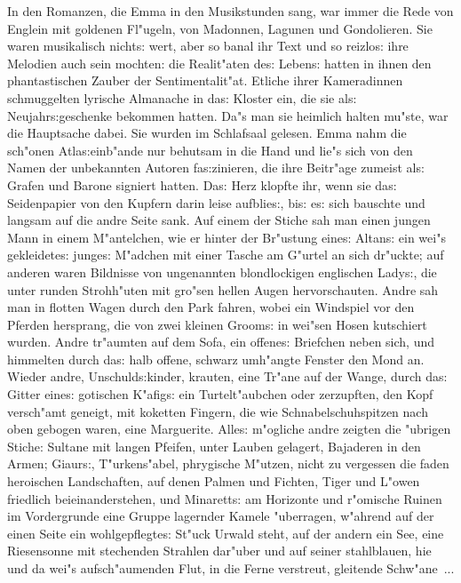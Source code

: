 \documentclass[oneside,12pt]{book}
\newcommand{\s}{s:}%
\begin{document}
In den Romanzen, die Emma in den Musikstunden sang, war immer die
Rede von Englein mit goldenen Fl"ugeln, von Madonnen, Lagunen und
Gondolieren. Sie waren musikalisch nicht{\s} wert, aber so banal
ihr Text und so reizlo{\s} ihre Melodien auch sein mochten: die
Realit"aten de{\s} Leben{\s} hatten in ihnen den phantastischen
Zauber der Sentimentalit"at. Etliche ihrer Kameradinnen
schmuggelten lyrische Almanache in da{\s} Kloster ein, die sie
al{\s} Neujahr{\s}geschenke bekommen hatten. Da"s man sie heimlich
halten mu"ste, war die Hauptsache dabei. Sie wurden im Schlafsaal
gelesen. Emma nahm die sch"onen Atla{\s}einb"ande nur behutsam in
die Hand und lie"s sich von den Namen der unbekannten Autoren
fa{\s}\/zinieren, die ihre Beitr"age zumeist al{\s} Grafen und
Barone signiert hatten. Da{\s} Herz klopfte ihr, wenn sie da{\s}
Seidenpapier von den Kupfern darin leise aufblie{\s}, bi{\s} e{\s}
sich bauschte und langsam auf die andre Seite sank. Auf einem der
Stiche sah man einen jungen Mann in einem M"antelchen, wie er
hinter der Br"ustung eine{\s} Altan{\s} ein wei"s gekleidete{\s}
junge{\s} M"adchen mit einer Tasche am G"urtel an sich dr"uckte;
auf anderen waren Bildnisse von ungenannten blondlockigen
englischen Lady{\s}, die unter runden Strohh"uten mit gro"sen
hellen Augen hervorschauten. Andre sah man in flotten Wagen durch
den Park fahren, wobei ein Windspiel vor den Pferden hersprang,
die von zwei kleinen Groom{\s} in wei"sen Hosen kutschiert wurden.
Andre tr"aumten auf dem Sofa, ein offene{\s} Briefchen neben sich,
und himmelten durch da{\s} halb offene, schwarz umh"angte Fenster
den Mond an. Wieder andre, Unschuld{\s}kinder, krauten, eine
Tr"ane auf der Wange, durch da{\s} Gitter eine{\s} gotischen
K"afig{\s} ein Turtelt"aubchen oder zerzupften, den Kopf
versch"amt geneigt, mit koketten Fingern, die wie
Schnabelschuhspitzen nach oben gebogen waren, eine Marguerite.
Alle{\s} m"ogliche andre zeigten die "ubrigen Stiche: Sultane mit
langen Pfeifen, unter Lauben gelagert, Bajaderen in den Armen;
Giaur{\s}, T"urkens"abel, phrygische M"utzen, nicht zu vergessen
die faden heroischen Landschaften, auf denen Palmen und Fichten,
Tiger und L"owen friedlich beieinanderstehen, und Minarett{\s} am
Horizonte und r"omische Ruinen im Vordergrunde eine Gruppe
lagernder Kamele "uberragen, w"ahrend auf der einen Seite ein
wohlgepflegte{\s} St"uck Urwald steht, auf der andern ein See,
eine Riesensonne mit stechenden Strahlen dar"uber und auf seiner
stahlblauen, hie und da wei"s aufsch"aumenden Flut, in die Ferne
verstreut, gleitende Schw"ane~...
\end{document}
